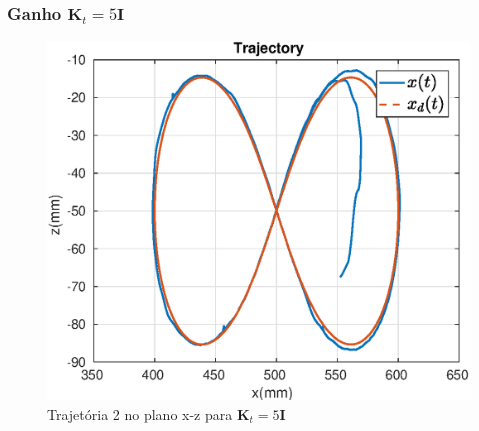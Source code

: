 \subsubsection{Ganho $\bm{K}_t = 5\bm{I}$}

\begin{figure}[H]
\centering
  \includegraphics[width=0.5\linewidth]{./img/traj_2_k5/traj.eps}
  \caption{Trajetória 2 no plano x-z para $\bm{K}_t = 5\bm{I}$}
  \label{fig:sub1}
\end{figure}%

